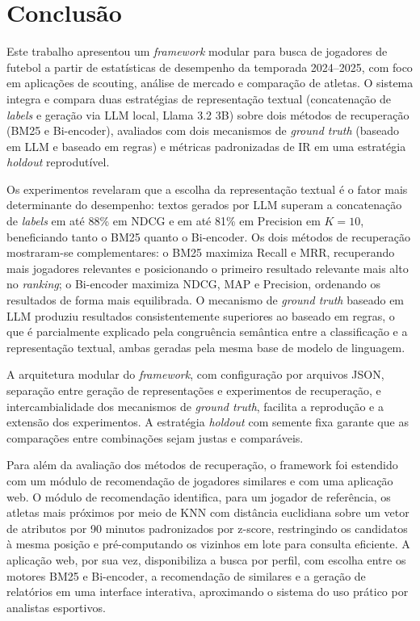 \documentclass[portuguese]{sbc2025}
\begin{document}
\section{Conclusão}
\label{sec:conc}

Este trabalho apresentou um \textit{framework} modular para busca de jogadores de
futebol a partir de estatísticas de desempenho da temporada 2024--2025, com foco em
aplicações de scouting, análise de mercado e comparação de atletas. O sistema integra
e compara duas estratégias de representação textual (concatenação de \textit{labels}
e geração via LLM local, Llama 3.2 3B) sobre dois métodos de recuperação (BM25 e
Bi-encoder), avaliados com dois mecanismos de \textit{ground truth} (baseado em LLM
e baseado em regras) e métricas padronizadas de IR em uma estratégia \textit{holdout}
reprodutível.

Os experimentos revelaram que a escolha da representação textual é o fator mais
determinante do desempenho: textos gerados por LLM superam a concatenação de
\textit{labels} em até 88\% em NDCG e em até 81\% em Precision em $K=10$,
beneficiando tanto o BM25 quanto o Bi-encoder. Os dois métodos de recuperação
mostraram-se complementares: o BM25 maximiza Recall e MRR, recuperando mais
jogadores relevantes e posicionando o primeiro resultado relevante mais alto no
\textit{ranking}; o Bi-encoder maximiza NDCG, MAP e Precision, ordenando os
resultados de forma mais equilibrada. O mecanismo de \textit{ground truth} baseado
em LLM produziu resultados consistentemente superiores ao baseado em regras, o que
é parcialmente explicado pela congruência semântica entre a classificação e a
representação textual, ambas geradas pela mesma base de modelo de linguagem.

A arquitetura modular do \textit{framework}, com configuração por arquivos JSON,
separação entre geração de representações e experimentos de recuperação, e
intercambialidade dos mecanismos de \textit{ground truth}, facilita a reprodução
e a extensão dos experimentos. A estratégia \textit{holdout} com semente fixa garante
que as comparações entre combinações sejam justas e comparáveis.

Para além da avaliação dos métodos de recuperação, o framework foi estendido com
um módulo de recomendação de jogadores similares e com uma aplicação web. O
módulo de recomendação identifica, para um jogador de referência, os atletas
mais próximos por meio de KNN com distância euclidiana sobre um vetor de
atributos por 90 minutos padronizados por z-score, restringindo os candidatos à
mesma posição e pré-computando os vizinhos em lote para consulta eficiente. A
aplicação web, por sua vez, disponibiliza a busca por perfil, com escolha
entre os motores BM25 e Bi-encoder, a recomendação de similares e a geração
de relatórios em uma interface interativa, aproximando o sistema do uso prático
por analistas esportivos.
\end{document}
